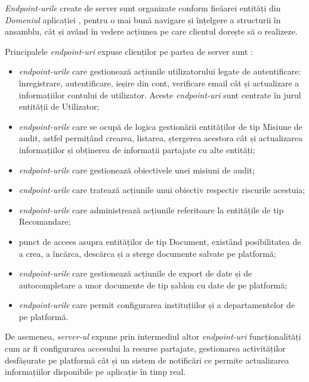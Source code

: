 \textit{Endpoint-urile} create de server sunt organizate conform fieăarei entități din \textit{Domeniul} aplicației , pentru o mai bună navigare și înțelgere a structurii în ansamblu, cât și având în vedere acțiunea pe care clientul dorește să o realizeze.

Principalele \textit{endpoint-uri} expuse clienților pe partea de server sunt :

\begin{itemize}
	
	\item \textit{endpoint-urile} care gestionează acțiunile utilizatorului legate de autentificare: înregistrare, autentificare, ieșire din cont, verificare email cât și actualizare a informațiilor contului de utilizator. Aceste \textit{endpoint-uri} sunt centrate în jurul entității de Utilizator;
	
	\item \textit{endpoint-urile} care se ocupă de logica gestionării entităților de tip Misiune de audit, astfel permițând crearea, listarea, ștergerea acestora cât și actualizarea informațiilor și obținerea de informații partajate cu alte entități;
	
	\item \textit{endpoint-urile} care gestionează obiectivele unei misiuni de audit;
	
	\item \textit{endpoint-urile} care tratează acțiunile unui obiectiv respectiv riscurile acestuia;
	
	\item \textit{endpoint-urile} care administrează acțiunile referitoare la entitățile de tip Recomandare;
	
	\item punct de accees asupra entităților de tip Document, existând posibilitatea de a crea, a încărca, descărca și a sterge documente salvate pe platformă;
	
	\item \textit{endpoint-urile} care gestionează acțiunile de export de date și de autocompletare a unor documente de tip șablon cu date de pe platformă;
	
	\item \textit{endpoint-urile} care permit configurarea instituțiilor și a departamentelor de pe platformă.
	
\end{itemize} 

De asemenea, \textit{server-ul} expune prin intermediul altor \textit{ endpoint-uri} funcționalități cum ar fi configurarea accesului la resurse partajate, gestionarea activităților desfășurate pe platformă cât și un sistem de notificări ce permite actualizarea informațiilor disponibile pe aplicație în timp real.


